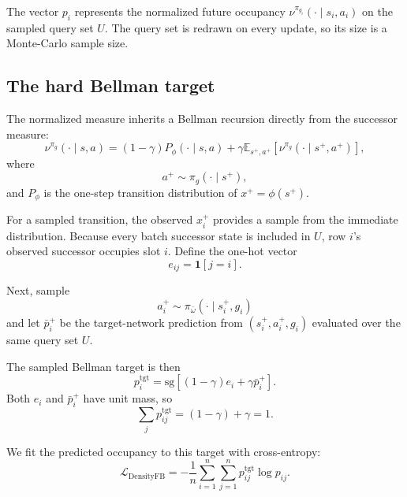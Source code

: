 \documentclass{article}
\newcommand{\E}{\mathbb{E}}
\newcommand{\ind}[1]{\mathbf{1}\!\left[#1\right]}
\newcommand{\sg}{\mathrm{sg}}
\begin{document}
The vector $p_i$ represents the normalized future occupancy
$\nu^{\pi_{g_i}}(\cdot\mid s_i,a_i)$ on the sampled query set $U$.
The query set is redrawn on every update, so its size is a Monte-Carlo sample size.

\subsection{The hard Bellman target}

The normalized measure inherits a Bellman recursion directly from the successor measure:
\begin{equation}
\label{eq:normalized-bellman}
    \nu^{\pi_g}(\cdot\mid s,a) = (1-\gamma) P_\phi(\cdot\mid s,a) + \gamma \E_{s^+,a^+} \left[ \nu^{\pi_g}(\cdot\mid s^+,a^+) \right],
\end{equation}
where
\begin{equation}
    a^+ \sim \pi_g(\cdot\mid s^+),
\end{equation}
and $P_\phi$ is the one-step transition distribution of
$x^+=\phi(s^+)$.

For a sampled transition, the observed $x_i^+$ provides a sample from the immediate distribution.
Because every batch successor state is included in $U$, row $i$'s observed successor occupies slot $i$.
Define the one-hot vector
\begin{equation}
    e_{ij} = \ind{j=i}.
\end{equation}

Next, sample
\begin{equation}
a_i^+
\sim
\pi_{\bar\omega}(\cdot\mid s_i^+,g_i)
\end{equation}
and let $\bar p_i^+$ be the target-network prediction from $(s_i^+,a_i^+,g_i)$ evaluated over the same query set $U$.

The sampled Bellman target is then
\begin{equation}
\label{eq:hard-target}
    p_i^{\mathrm{tgt}} = \sg\left[ (1-\gamma)e_i + \gamma\bar p_i^+ \right].
\end{equation}
Both $e_i$ and $\bar p_i^+$ have unit mass, so
\begin{equation}
    \sum_j p_{ij}^{\mathrm{tgt}} = (1-\gamma)+\gamma = 1.
\end{equation}

We fit the predicted occupancy to this target with cross-entropy:
\begin{equation}
\label{eq:density-loss}
\mathcal L_{\mathrm{DensityFB}}
=
-
\frac1n
\sum_{i=1}^n
\sum_{j=1}^n
p_{ij}^{\mathrm{tgt}}
\log p_{ij}.
\end{equation}
\end{document}
